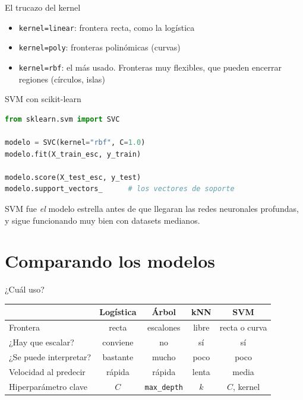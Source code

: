 \begin{frame}{El trucazo del kernel}
  \begin{itemize}
    \item \texttt{kernel=\textquotedbl{}linear\textquotedbl{}}: frontera recta, como la logística
    \item \texttt{kernel=\textquotedbl{}poly\textquotedbl{}}: fronteras polinómicas (curvas)
    \item \texttt{kernel=\textquotedbl{}rbf\textquotedbl{}}: el más usado. Fronteras muy flexibles, que
      pueden encerrar regiones (círculos, islas)
  \end{itemize}
  \pause
\end{frame}

\begin{frame}[fragile]{SVM con scikit-learn}
  \begin{lstlisting}[language=Python]
from sklearn.svm import SVC

modelo = SVC(kernel="rbf", C=1.0)
modelo.fit(X_train_esc, y_train)

modelo.score(X_test_esc, y_test)
modelo.support_vectors_      # los vectores de soporte
  \end{lstlisting}
  SVM fue \emph{el} modelo estrella antes de que llegaran las redes
  neuronales profundas, y sigue funcionando muy bien con datasets
  medianos.
\end{frame}

\section{Comparando los modelos}

\begin{frame}{¿Cuál uso?}
  \begin{center}
    \small
    \begin{tabular}{lcccc}
      \toprule
      & Logística & Árbol & kNN & SVM \\
      \midrule
      Frontera & recta & escalones & libre & recta o curva \\
      ¿Hay que escalar? & conviene & no & sí & sí \\
      ¿Se puede interpretar? & bastante & mucho & poco & poco \\
      Velocidad al predecir & rápida & rápida & lenta & media \\
      Hiperparámetro clave & $C$ & \texttt{max\_depth} & $k$ & $C$, kernel \\
      \bottomrule
    \end{tabular}
  \end{center}
  \pause
\end{frame}

